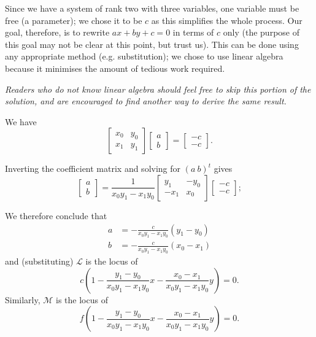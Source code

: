 \documentclass[a4paper,10pt]{article}
\begin{document}
Since we have a system of rank two with three variables, one variable must be free (a parameter); we chose it to be $ c $ as this
simplifies the whole process. Our goal, therefore, is to rewrite $ ax + by + c = 0 $ in terms of $ c $ only (the purpose of this
goal may not be clear at this point, but trust us). This can be done using any appropriate method (e.g. substitution); we chose to
use linear algebra because it minimises the amount of tedious work required.

\begin{mdframed}[hidealllines=true,backgroundcolor=Dandelion!20]
\textit{Readers who do not know linear algebra should feel free to skip this portion of the solution, and are encouraged to find
another way to derive the same result.}

We have
\begin{displaymath}
  \begin{bmatrix} x_0 & y_0 \\ x_1 & y_1 \end{bmatrix} \begin{bmatrix} a\\b \end{bmatrix} = \begin{bmatrix} -c\\-c \end{bmatrix}.
\end{displaymath}

Inverting the coefficient matrix and solving for $ (a\ b)^t $ gives
\begin{displaymath}
  \begin{bmatrix} a\\b \end{bmatrix} = \frac{1}{x_0 y_1 - x_1 y_0} \begin{bmatrix} y_1 & -y_0 \\ -x_1 & x_0 \end{bmatrix} \begin{bmatrix} -c\\-c \end{bmatrix};
\end{displaymath}
\end{mdframed}

We therefore conclude that
\begin{align*}
  a &= -\frac{c}{x_0 y_1 - x_1 y_0} (y_1 - y_0)\\
  b &= -\frac{c}{x_0 y_1 - x_1 y_0} (x_0 - x_1)
\end{align*}
and (substituting) $ \mathcal{L} $ is the locus of
\begin{displaymath}
  c \left(1 - \frac{y_1 - y_0}{x_0 y_1 - x_1 y_0} x - \frac{x_0 - x_1}{x_0 y_1 - x_1 y_0} y \right) = 0.
\end{displaymath}
Similarly, $ \mathcal{M} $ is the locus of
\begin{displaymath}
  f \left(1 - \frac{y_1 - y_0}{x_0 y_1 - x_1 y_0} x - \frac{x_0 - x_1}{x_0 y_1 - x_1 y_0} y \right) = 0.
\end{displaymath}
\end{document}

